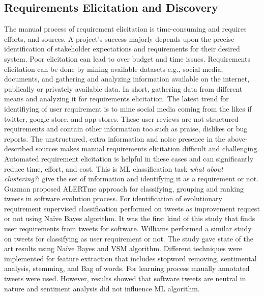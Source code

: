 
\subsection{Requirements Elicitation and Discovery}

The manual process of requirement elicitation is time-consuming and requires
efforts, and sources. A project's success majorly depends
upon the precise identification of stakeholder expectations and requirements for their desired
system. Poor elicitation can lead to over budget and time issues.
 Requirements elicitation can be done by mining
available datasets e.g., social media, documents, and gathering and analyzing information available on the internet,
publically or privately available data. In short, gathering data from different
means and analyzing it for requirements elicitation.  The latest trend for
identifiying of user requirement is to mine social media coming from the likes
if twitter, google store, and app stores. These user reviews are not
structured requirements and contain other information too such as praise,
dislikes or bug reports. The unstructured, extra information and noise
presence in the above-described sources makes manual requirements
elicitation difficult and challenging. Automated requirement elicitation
is helpful in these cases and can significantly reduce time, effort, and cost.
This is ML classification task \emph{what about clustering?}: give the set of
information and identifying it as a requirement or not.
\\

Guzman \etal \cite{Guzman:2017} proposed ALERTme approach for classifying,
grouping and ranking tweets in software evolution process. For identification of
evolutionary requirement supervised classification performed on tweets as
improvement request or not using Naïve Bayes algorithm. It was the first kind of
this study that finds user requirements from tweets for software. Williams \etal
 \cite{Williams:2017} performed a similar study on
tweets for classifying as user requirement or not. The study gave state of the
art results using Naïve Bayes and VSM algorithm. Different
techniques were implemented for feature extraction that includes stopword removing, sentimental
analysis, stemming, and Bag of words.
For learning process maually annotated tweets were used. However, results showed
that software tweets are neutral in nature and sentiment analysis did not
influence ML algorithm.\\

